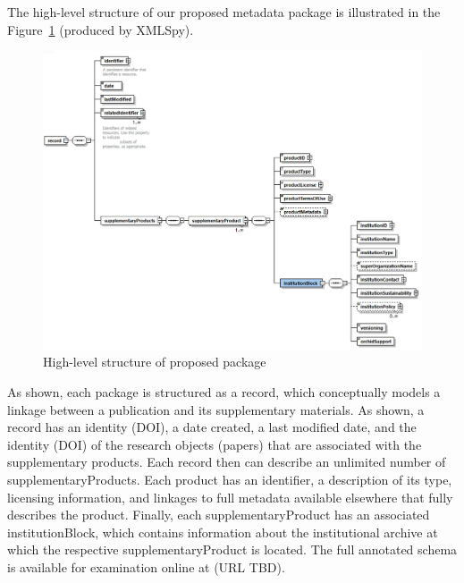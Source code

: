 The high-level structure of our proposed metadata package is illustrated in the Figure~\ref{fig:schema_v1} (produced by XMLSpy). 
\begin{figure}
	\includegraphics[width=\textwidth]{images/schema_v1}
	\caption{\label{fig:schema_v1}High-level structure of proposed package}
\end{figure} 
As shown, each package is structured as a record, which conceptually models a linkage between a publication and its supplementary materials.  As shown, a record has an identity (DOI), a date created, a last modified date, and the identity (DOI) of the research objects (papers) that are associated with the supplementary products.
Each record then can describe an unlimited number of supplementaryProducts.  Each product has an identifier, a description of its type, licensing information, and linkages to full metadata available elsewhere that fully describes the product.  Finally, each supplementaryProduct has an associated institutionBlock, which contains information about the institutional archive at which the respective supplementaryProduct is located.  
The full annotated schema is available for examination online at (URL TBD).